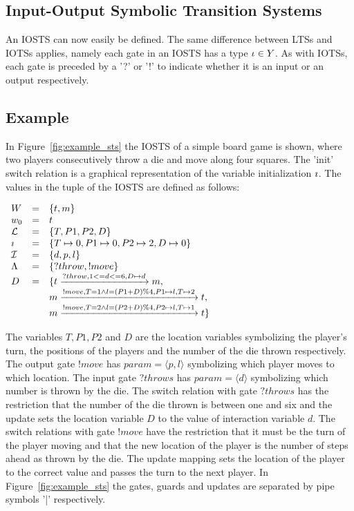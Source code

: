 \subsection{Input-Output Symbolic Transition Systems}
An IOSTS can now easily be defined. The same difference between LTSs and IOTSs applies, namely each gate in an IOSTS has a type $\iota \in Y$. As with IOTSs, each gate is preceded by a '?' or '!' to indicate whether it is an input or an output respectively.

\subsection{Example}\label{sec:sts_example}
In Figure~\ref{fig:example_sts} the IOSTS of a simple board game is shown, where two players consecutively throw a die and move along four squares. The 'init' switch relation is a graphical representation of the variable initialization $\imath$. The values in the tuple of the IOSTS are defined as follows:

$\begin{array}{lcl}
W & = & \{t, m\} \\
w_0 & = & t \\
\mathcal{L} & = & \{T, P1, P2, D\} \\
\imath & = & \{T \mapsto 0, P1 \mapsto 0, P2 \mapsto 2, D \mapsto 0\} \\
\mathcal{I} & = & \{d, p, l\} \\
\Lambda & = & \{?throw, !move\} \\
D & = & \{t\xrightarrow{?throw, 1 <= d <= 6, D \mapsto d}m, \\
 & & m\xrightarrow{!move, T=1 \land l=(P1+D)\%4, P1 \mapsto l, T \mapsto 2}t, \\
 & & m\xrightarrow{!move, T=2 \land l=(P2+D)\%4, P2 \mapsto l, T \mapsto 1}t\}
\end{array}$

The variables $T, P1, P2$ and $D$ are the location variables symbolizing the player's turn, the positions of the players and the number of the die thrown respectively. The output gate $!move$ has $param = \langle p, l\rangle$ symbolizing which player moves to which location. The input gate $\mathit{?throws}$ has $\mathit{param} = \langle d\rangle$ symbolizing which number is thrown by the die. The switch relation with gate $\mathit{?throws}$ has the restriction that the number of the die thrown is between one and six and the update sets the location variable $D$ to the value of interaction variable $d$. The switch relations with gate $!move$ have the restriction that it must be the turn of the player moving and that the new location of the player is the number of steps ahead as thrown by the die. The update mapping sets the location of the player to the correct value and passes the turn to the next player. In Figure~\ref{fig:example_sts} the gates, guards and updates are separated by pipe symbols '|' respectively.

